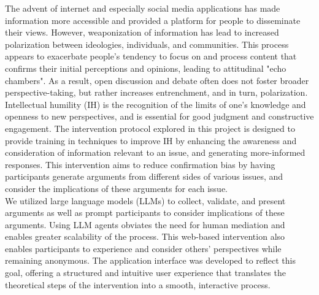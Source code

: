 \documentclass[journal]{IEEEtran}
\begin{document}
The advent of internet and especially social media applications has made information more accessible and provided a platform for people to disseminate their views. However, weaponization of information has lead to increased polarization between ideologies, individuals, and communities. This process appears to exacerbate people's tendency to focus on and process content that confirms their initial perceptions and opinions, leading to attitudinal "echo chambers". As a result, open discussion and debate often does not foster broader perspective-taking, but rather increases entrenchment, and in turn, polarization.\\
Intellectual humility (IH) is the recognition of the limits of one's knowledge and openness to new perspectives, and is essential for good judgment and constructive engagement. The intervention protocol explored in this project is designed to provide training in techniques to improve IH by enhancing the awareness and consideration of information relevant to an issue, and generating more-informed responses. This intervention aims to reduce confirmation bias by having participants generate arguments from different sides of various issues, and consider the implications of these arguments for each issue.\\
We utilized large language models (LLMs) to collect, validate, and present arguments as well as prompt participants to consider implications of these arguments. Using LLM agents obviates the need for human mediation and enables greater scalability of the process. This web-based intervention also enables participants to experience and consider others' perspectives while remaining anonymous. The application interface was developed to reflect this goal, offering a structured and intuitive user experience that translates the theoretical steps of the intervention into a smooth, interactive process.
\end{document}
